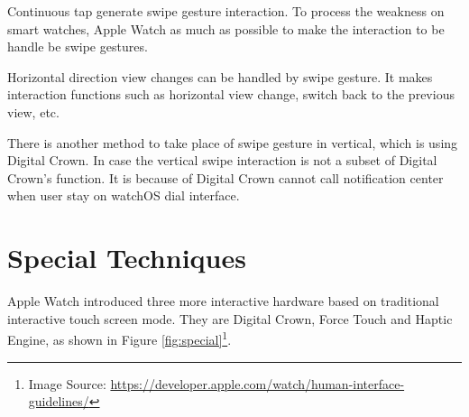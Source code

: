 Continuous tap generate swipe gesture interaction.
To process the weakness on smart watches, Apple Watch as much as possible to make the interaction to be handle be swipe gestures.

Horizontal direction view changes can be handled by swipe gesture.
It makes interaction functions such as horizontal view change, switch back to the previous view, etc.

There is another method to take place of swipe gesture in vertical, which is using Digital Crown.
In case the vertical swipe interaction is not a subset of Digital Crown's function. It is because of Digital Crown cannot call notification center when user stay on watchOS dial interface.

\section{Special Techniques}

Apple Watch introduced three more interactive hardware based on traditional interactive touch screen mode. They are Digital Crown, Force Touch and Haptic Engine, as shown in Figure \ref{fig:special}\footnote{Image Source: \url{https://developer.apple.com/watch/human-interface-guidelines/}}.


